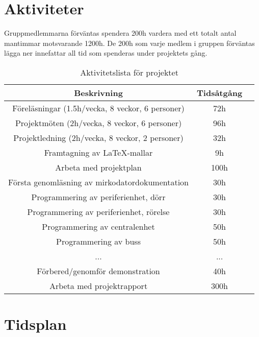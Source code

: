 \documentclass{article}
\begin{document}
\section{Aktiviteter}

Gruppmedlemmarna förväntas spendera 200h vardera med ett totalt antal mantimmar motsvarande 1200h. De 200h som varje medlem i gruppen förväntas lägga ner innefattar all tid som spenderas under projektets gång.

\begin{table}[!h]
    \begin{center}
    \begin{tabular}{ |c|c|c| }\hline
    Beskrivning & Tidsåtgång \\\hline\hline
    Föreläsningar (1.5h/vecka, 8 veckor, 6 personer) & 72h \\\hline
    Projektmöten (2h/vecka, 8 veckor, 6 personer) & 96h \\\hline
    Projektledning (2h/vecka, 8 veckor, 2 personer) & 32h \\\hline
    Framtagning av LaTeX-mallar & 9h \\\hline
    Arbeta med projektplan & 100h \\\hline
    Första genomläsning av mirkodatordokumentation & 30h \\\hline
    Programmering av periferienhet, dörr & 30h \\\hline
    Programmering av periferienhet, rörelse & 30h \\\hline
    Programmering av centralenhet & 50h \\\hline
    Programmering av buss & 50h \\\hline
    ... & ... \\\hline
    Förbered/genomför demonstration & 40h \\\hline
    Arbeta med projektrapport & 300h \\\hline
    \end{tabular}
    \caption{Aktivitetslista för projektet}
    \label{milstolpar}
    \end{center}
\end{table}

\section{Tidsplan}
\end{document}
